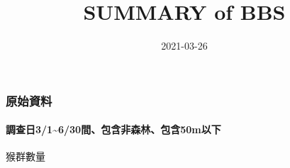 \documentclass[
]{article}
\title{SUMMARY of BBS}
\author{}
\date{\vspace{-2.5em}2021-03-26}
\begin{document}
\maketitle

\hypertarget{ux539fux59cbux8cc7ux6599}{%
\subsubsection{\texorpdfstring{\textbf{原始資料}}{原始資料}}\label{ux539fux59cbux8cc7ux6599}}

\hypertarget{ux8abfux67e5ux65e531630ux9593ux5305ux542bux975eux68eeux6797ux5305ux542b50mux4ee5ux4e0b}{%
\paragraph{\texorpdfstring{\textbf{調查日3/1\textasciitilde6/30間、包含非森林、包含50m以下}}{調查日3/1\textasciitilde6/30間、包含非森林、包含50m以下}}\label{ux8abfux67e5ux65e531630ux9593ux5305ux542bux975eux68eeux6797ux5305ux542b50mux4ee5ux4e0b}}

猴群數量
\end{document}
